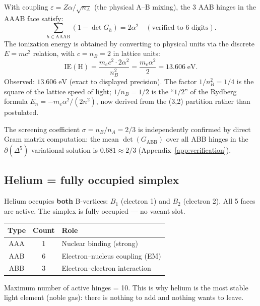 With coupling $\varepsilon = Z\alpha/\sqrt{n_A}$ (the physical A--B mixing), the 3 AAB hinges in the AAAB face satisfy:
\begin{equation}
\sum_{h \in \mathrm{AAAB}}(1 - \det G_h) = 2\alpha^2
\quad (\text{verified to 6 digits}).
\end{equation}
The ionization energy is obtained by converting to physical units via the discrete $E = mc^2$ relation, with $c = n_B = 2$ in lattice units:
\begin{equation}
\boxed{\text{IE}(\text{H}) = \frac{m_e c^2 \cdot 2\alpha^2}{n_B^2} = \frac{m_e \alpha^2}{2} = 13.606\;\text{eV}.}
\end{equation}
Observed: $13.606\;\text{eV}$ (exact to displayed precision).  The factor $1/n_B^2 = 1/4$ is the square of the lattice speed of light; $1/n_B = 1/2$ is the ``$1/2$'' of the Rydberg formula $E_n = -m_e\alpha^2/(2n^2)$, now derived from the (3,2) partition rather than postulated.

\begin{remark}
The screening coefficient $\sigma = n_B/n_A = 2/3$ is independently confirmed by direct Gram matrix computation: the mean $\det(G_\mathrm{ABB})$ over all ABB hinges in the $\partial(\Delta^5)$ variational solution is $0.681 \approx 2/3$ (Appendix~\ref{app:verification}).
\end{remark}

\subsection{Helium = fully occupied simplex}

Helium occupies \textbf{both} B-vertices: $B_1$ (electron 1) and $B_2$ (electron 2). All 5 faces are active. The simplex is fully occupied --- no vacant slot.

\begin{center}
\begin{tabular}{ccl}
\hline
Type & Count & Role \\
\hline
AAA & 1 & Nuclear binding (strong) \\
AAB & 6 & Electron--nucleus coupling (EM) \\
ABB & 3 & Electron--electron interaction \\
\hline
\end{tabular}
\end{center}

Maximum number of active hinges = 10. This is why helium is the most stable light element (noble gas): there is nothing to add and nothing wants to leave.

